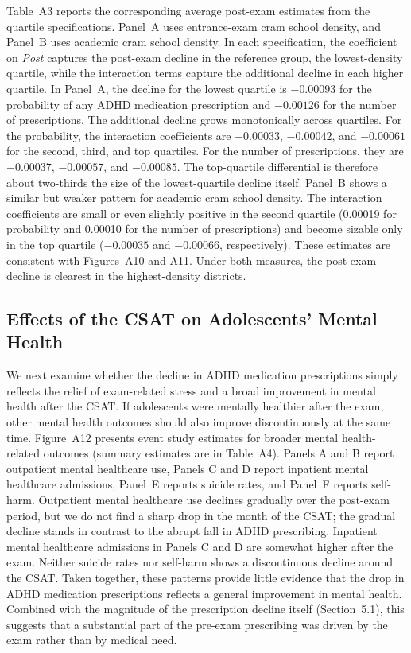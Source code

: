 \documentclass[12pt]{article}
\begin{document}
Table~A3 reports the corresponding average post-exam estimates from the quartile specifications. Panel~A uses entrance-exam cram school density, and Panel~B uses academic cram school density. In each specification, the coefficient on \textit{Post} captures the post-exam decline in the reference group, the lowest-density quartile, while the interaction terms capture the additional decline in each higher quartile. In Panel~A, the decline for the lowest quartile is $-0.00093$ for the probability of any ADHD medication prescription and $-0.00126$ for the number of prescriptions. The additional decline grows monotonically across quartiles. For the probability, the interaction coefficients are $-0.00033$, $-0.00042$, and $-0.00061$ for the second, third, and top quartiles. For the number of prescriptions, they are $-0.00037$, $-0.00057$, and $-0.00085$. The top-quartile differential is therefore about two-thirds the size of the lowest-quartile decline itself. Panel~B shows a similar but weaker pattern for academic cram school density. The interaction coefficients are small or even slightly positive in the second quartile (0.00019 for probability and 0.00010 for the number of prescriptions) and become sizable only in the top quartile ($-0.00035$ and $-0.00066$, respectively). These estimates are consistent with Figures~A10 and A11. Under both measures, the post-exam decline is clearest in the highest-density districts.

\subsection{Effects of the CSAT on Adolescents' Mental Health}

We next examine whether the decline in ADHD medication prescriptions simply reflects the relief of exam-related stress and a broad improvement in mental health after the CSAT. If adolescents were mentally healthier after the exam, other mental health outcomes should also improve discontinuously at the same time. Figure~A12 presents event study estimates for broader mental health-related outcomes (summary estimates are in Table~A4). Panels A and B report outpatient mental healthcare use, Panels C and D report inpatient mental healthcare admissions, Panel~E reports suicide rates, and Panel~F reports self-harm. Outpatient mental healthcare use declines gradually over the post-exam period, but we do not find a sharp drop in the month of the CSAT; the gradual decline stands in contrast to the abrupt fall in ADHD prescribing. Inpatient mental healthcare admissions in Panels C and D are somewhat higher after the exam. Neither suicide rates nor self-harm shows a discontinuous decline around the CSAT. Taken together, these patterns provide little evidence that the drop in ADHD medication prescriptions reflects a general improvement in mental health. Combined with the magnitude of the prescription decline itself (Section~5.1), this suggests that a substantial part of the pre-exam prescribing was driven by the exam rather than by medical need.
\end{document}
